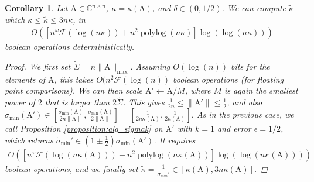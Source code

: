 \documentclass{article}
\newcommand{\lbrac}{\left[}
\newcommand{\rbrac}{\right]}
\newcommand{\lpar}{\left(}
\newcommand{\rpar}{\right)}
\newtheorem{corollary}{Corollary}[section]
\DeclareMathOperator{\polylog}{polylog}
\newcommand\matA{\boldsymbol{\mathrm{A}}}
\newcommand{\flopcost}{\mathcal{F}}
\begin{document}
\begin{corollary}
    \label{corollary:alg_cond}
    Let $\matA\in\mathbb{C}^{n\times n}$, $\kappa=\kappa(\matA)$, and $\delta\in(0,1/2)$. We can compute $\widetilde\kappa$ which $\kappa\leq \widetilde\kappa\leq  3n\kappa$, in 
    \begin{align*}
        O\lpar
            \lbrac
                n^{\omega}\flopcost(\log(n\kappa))
                +
                n^2\polylog(n\kappa)
            \rbrac
            \log(\log(n\kappa))
        \rpar
    \end{align*}
    boolean operations deterministically. 
    \begin{proof}
        We first set  $\widetilde\Sigma=n\|\matA\|_{\max}$. Assuming $O(\log(n))$ bits for the elements of $\matA$, this takes $O(n^2\flopcost(\log(n))$ boolean operations (for floating point comparisons). We can then scale $\matA'\leftarrow \matA/M$, where $M$ is again the smallest power of $2$ that is larger than $2\widetilde\Sigma$.
        This gives $\frac{1}{2n}\leq \|\matA'\|\leq \frac{1}{2}$, and also $\sigma_{\min}(\matA')
        \in
        \lbrac \tfrac{\sigma_{\min}(\matA)}{2n\|\matA\|}, \tfrac{\sigma_{\min}(\matA)}{2\|\matA\|} \rbrac = 
        \lbrac 
        \tfrac{1}{2n\kappa(\matA)}, \tfrac{1}{2\kappa(\matA)} \rbrac
        $.
        As in the previous case, we  call Proposition \ref{proposition:alg_sigmak} on $\matA'$ with $k=1$ and error $\epsilon=1/2$, which returns $\widetilde\sigma_{\min}'\in(1\pm \tfrac{1}{2}) 
        \sigma_{\min}(\matA')$. It requires
        \begin{align*}
            O\lpar
                \lbrac
                    n^{\omega}\flopcost(\log(n\kappa(\matA)))
                    +
                    n^2\polylog(n\kappa(\matA))
                \rbrac
                \log(\log(n\kappa(\matA)))
            \rpar
        \end{align*}
        boolean operations, and we finally  set $\widetilde\kappa= \frac{1}{\widetilde\sigma_{\min}'}\in \lbrac
            \kappa(\matA), 3n\kappa(\matA)
        \rbrac$.
    \end{proof}
\end{corollary}
\end{document}
